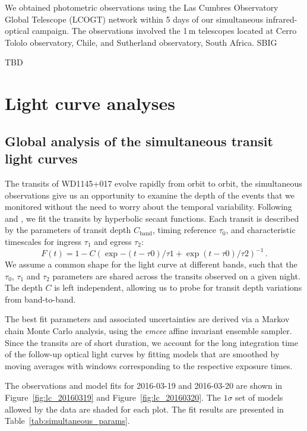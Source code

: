 \documentclass[iop,useAMES,usenatbig]{emulateapj}
\begin{document}
We obtained photometric observations using the Las Cumbres Observatory Global Telescope (LCOGT) network within 5 days of our simultaneous infrared-optical campaign. The observations involved the 1\,m telescopes located at Cerro Tololo observatory, Chile, and Sutherland observatory, South Africa. SBIG  

TBD

\section{Light curve analyses}
\label{sec:lightcurve_model}

\subsection{Global analysis of the simultaneous transit light curves}
\label{sec:simultaneous_lc}

The transits of WD1145+017 evolve rapidly from orbit to orbit, the simultaneous observations give us an opportunity to examine the depth of the events that we monitored without the need to worry about the temporal variability. Following \citet{2012ApJ...752....1R} and \citet{2015arXiv151006434C}, we fit the transits by hyperbolic secant functions. Each transit is described by the parameters of transit depth $C_\mathrm{band}$, timing reference $\tau_0$, and characteristic timescales for ingress $\tau_1$ and egress $\tau_2$:
\begin{equation}
  F(t) = 1 - C \left( \exp{-(t-\tau0)/\tau1} + \exp{(t-\tau0)/\tau2} \right)^{-1}\,.
\end{equation}
We assume a common shape for the light curve at different bands, such that the $\tau_0$, $\tau_1$ and $\tau_2$ parameters are shared across the transits observed on a given night. The depth $C$ is left independent, allowing us to probe for transit depth variations from band-to-band.

The best fit parameters and associated uncertainties are derived via a Markov chain Monte Carlo analysis, using the \emph{emcee} \citep{2013PASP..125..306F} affine invariant ensemble sampler. Since the transits are of short duration, we account for the long integration time of the follow-up optical light curves by fitting models that are smoothed by moving averages with windows corresponding to the respective exposure times. 

The observations and model fits for 2016-03-19 and 2016-03-20 are shown in Figure~\ref{fig:lc_20160319} and Figure~\ref{fig:lc_20160320}. The $1\sigma$ set of models allowed by the data are shaded for each plot. The fit results are presented in Table~\ref{tab:simultaneous_params}. 
\end{document}
